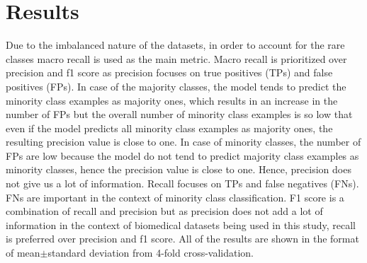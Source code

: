 
\chapter{Results}\label{chapter:results}

Due to the imbalanced nature of the datasets, in order to account for the rare classes macro recall is used as the main metric. Macro recall is prioritized over precision and f1 score as precision focuses on true positives (TPs) and false positives (FPs). In case of the majority classes, the model tends to predict the minority class examples as majority ones, which results in an increase in the number of FPs but the overall number of minority class examples is so low that even if the model predicts all minority class examples as majority ones, the resulting precision value is close to one. In case of minority classes, the number of FPs are low because the model do not tend to predict majority class  examples as minority classes, hence the precision value is close to one. Hence, precision does not give us a lot of information. Recall focuses on TPs and false negatives (FNs). FNs are important in the context of minority class classification. F1 score is a combination of recall and precision but as precision does not add a lot of information in the context of biomedical datasets being used in this study, recall is preferred over precision and f1 score. All of the results are shown in the format of mean$\pm$standard deviation from 4-fold cross-validation.

